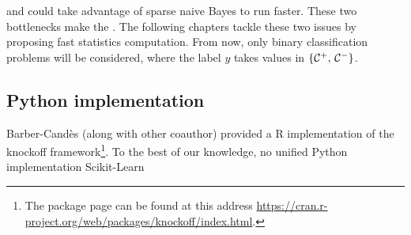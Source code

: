 and could take advantage of sparse naive Bayes to run faster.
\bigbreak
These two bottlenecks make the .
The following chapters tackle these two issues by proposing fast statistics computation.
From now, only binary classification problems will be considered, where the label $y$ takes values
in $\left\{ \mathcal{C}^+,\, \mathcal{C}^- \right\}$.

\subsection{Python implementation}\label{subsec:python_implementation}

Barber-Candès (along with other coauthor) provided a R implementation
of the knockoff framework\footnote{
The package page can be found at this address \url{https://cran.r-project.org/web/packages/knockoff/index.html}.
}.
To the best of our knowledge, no unified Python implementation
Scikit-Learn~\cite{sklearn}
